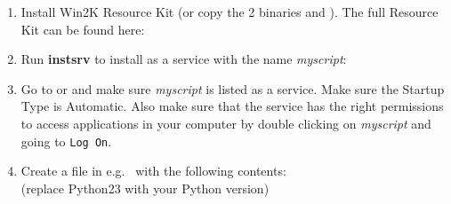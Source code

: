 \begin{enumerate}

\item Install Win2K \windowsindex Resource Kit (or copy the 2 binaries 
 and ). The full Resource Kit can be 
found here: \\
	  {\small {}}

\item Run {\bf instsrv} to install  as a service with the 
name {\it myscript}: \\
	  {\small {}} \windowsindex

\item Go to  or 
      and make sure {\it myscript} is listed as a service. Make sure the Startup Type is Automatic. Also make sure that the service has the right permissions to 
      access applications in your computer by double clicking on {\it myscript} and going to \verb|Log On|.

\item Create a  file in 
e.g.\  with the following contents: \\
	   \pythonindex
	  (replace Python23 \pythonversionindex with your Python \pythonindex version) 


\end{enumerate}
